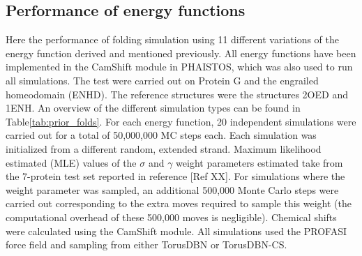 \subsection{Performance of energy functions}

Here the performance of folding simulation using 11 different variations of the energy function derived and mentioned previously.
All energy functions have been implemented in the CamShift module in PHAISTOS, which was also used to run all simulations.
The test were carried out on Protein G and the engrailed homeodomain (ENHD). The reference structures were the structures 2OED and 1ENH.
An overview of the different simulation types can be found in Table\ref{tab:prior_folds}.
For each energy function, 20 independent simulations were carried out for a total of 50,000,000 MC steps each.
Each simulation was initialized from a different random, extended strand.
Maximum likelihood estimated (MLE) values of the $\sigma$ and $\gamma$ weight parameters estimated take from the 7-protein test set reported in reference [Ref XX].
For simulations where the weight parameter was sampled, an additional 500,000 Monte Carlo steps were carried out corresponding to the extra moves required to sample this weight (the computational overhead of these 500,000 moves is negligible).
Chemical shifts were calculated using the CamShift module.
All simulations used the PROFASI force field and sampling from either TorusDBN or TorusDBN-CS.

